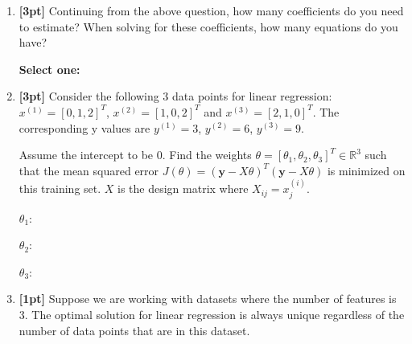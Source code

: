 \begin{enumerate}
    
    
    \clearpage
    
    \item \textbf{[3pt]} Continuing from the above question, how many coefficients do you need to estimate? When solving for these coefficients, how many equations do you have?
    
    \textbf{Select one:}
    
    
    \item \textbf{[3pt]} Consider the following 3 data points for linear regression: $x^{(1)} = [0, 1, 2]^T$, $x^{(2)} = [1, 0, 2]^T$ and $x^{(3)} = [2, 1, 0]^T$. The corresponding y values are $y^{(1)}=3$, $y^{(2)}=6$, $y^{(3)}=9$.
    
    Assume the intercept to be 0. Find the weights $\theta = [\theta_1,  \theta_2,  \theta_3]^T \in \mathbb{R}^3$ such that the mean squared error $J(\theta) = (\textbf{y} - X\theta)^T(\textbf{y} - X\theta)$ is minimized on this training set. $X$ is the design matrix where $X_{ij} = x_j^{(i)}$. 
    
    $\theta_1$: \quad
    \begin{tcolorbox}[fit,height=1cm, width=4cm, blank, borderline={1pt}{-2pt},nobeforeafter]
    \end{tcolorbox}
    
    
    $\theta_2$: \quad
    \begin{tcolorbox}[fit,height=1cm, width=4cm, blank, borderline={1pt}{-2pt},nobeforeafter]
    \end{tcolorbox}
    
    
    $\theta_3$: \quad
    \begin{tcolorbox}[fit,height=1cm, width=4cm, blank, borderline={1pt}{-2pt},nobeforeafter]
    \end{tcolorbox}
    
    

    \item \textbf{[1pt]} Suppose we are working with datasets where the number of features is 3. The optimal solution for linear regression is always unique regardless of the number of data points that are in this dataset.
    

\end{enumerate}
